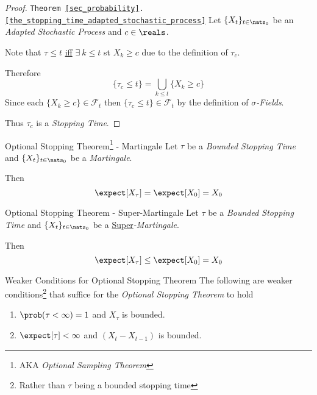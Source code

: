 \documentclass[11pt,a4paper]{article}
\begin{document}
  \begin{proof}{\texttt{Theorem \ref{sec_probability}.\ref{the_stopping_time_adapted_stochastic_process}}}
    Let $\{X_t\}_{t\in\nats_0}$ be an \textit{Adapted Stochastic Process} and $c\in\reals$.
    \par Note that $\tau\leq t$ \underline{iff} $\exists\ k\leq t$ st $X_k\geq c$ due to the definition of $\tau_c$.
    \par Therefore
    \[ \{\tau_c\leq t\}=\bigcup_{k\leq t}\{X_k\geq c\} \]
    Since each $\{X_k\geq c\}\in\mathcal{F}_t$ then $\{\tau_c\leq t\}\in\mathcal{F}_t$ by the definition of \textit{$\sigma$-Fields}.
    \par Thus $\tau_c$ is a \textit{Stopping Time}.\proved
  \end{proof}

  \begin{theorem}{Optional Stopping Theorem\footnote{AKA \textit{Optional Sampling Theorem}} - Martingale}\label{the_optional_stopping_theorem_martingale}
    Let $\tau$ be a \textit{Bounded Stopping Time} and $\{X_t\}_{t\in\nats_0}$ be a \textit{Martingale}.
    \par Then
    \[ \expect[X_\tau]=\expect[X_0]=X_0 \]
  \end{theorem}

  \begin{theorem}{Optional Stopping Theorem - Super-Martingale}
    Let $\tau$ be a \textit{Bounded Stopping Time} and $\{X_t\}_{t\in\nats_0}$ be a \underline{Super}\textit{-Martingale}.
    \par Then
    \[ \expect[X_\tau]\leq\expect[X_0]=X_0 \]
  \end{theorem}

  \begin{remark}{Weaker Conditions for Optional Stopping Theorem}\label{rem_weaker_optional_stopping_theorem}
    The following are weaker conditions\footnote{Rather than $\tau$ being a bounded stopping time} that suffice for the \textit{Optional Stopping Theorem} to hold
    \begin{enumerate}
      \item $\prob(\tau<\infty)=1$ and $X_\tau$ is bounded.
      \item $\expect[\tau]<\infty$ and $(X_t-X_{t-1})$ is bounded.
    \end{enumerate}
  \end{remark}
\end{document}
